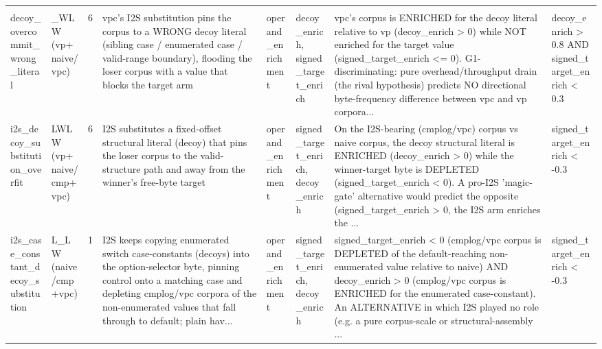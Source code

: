 \documentclass[7pt]{extarticle}
\begin{document}
{\begin{longtable}{@{}p{2.4cm}p{1.9cm}rp{4.3cm}p{1.5cm}p{1.7cm}p{4.6cm}p{3.0cm}@{}}
\midrule
\rowcolor{black!10}\multicolumn{8}{@{}l}{\textbf{[I2S-anti]\ \ i2s\_\allowbreak anti\_\allowbreak decoy\_\allowbreak overfit}\quad(final feature, n=14)}\\
decoy\_\allowbreak overcommit\_\allowbreak wrong\_\allowbreak literal & \_\allowbreak WLW (vp+naive/vpc) & 6 & vpc's I2S substitution pins the corpus to a WRONG decoy literal (sibling case / enumerated case / valid-range boundary), flooding the loser corpus with a value that blocks the target arm & operand\_\allowbreak enrichment & decoy\_\allowbreak enrich, signed\_\allowbreak target\_\allowbreak enrich & vpc's corpus is ENRICHED for the decoy literal relative to vp (decoy\_\allowbreak enrich \textgreater{} 0) while NOT enriched for the target value (signed\_\allowbreak target\_\allowbreak enrich \textless{}= 0). G1-discriminating: pure overhead/throughput drain (the rival hypothesis) predicts NO directional byte-frequency difference between vpc and vp corpora... & decoy\_\allowbreak enrich \textgreater{} 0.8 AND signed\_\allowbreak target\_\allowbreak enrich \textless{} 0.3\\
i2s\_\allowbreak decoy\_\allowbreak substitution\_\allowbreak overfit & LWLW (vp+naive/cmp+vpc) & 6 & I2S substitutes a fixed-offset structural literal (decoy) that pins the loser corpus to the valid-structure path and away from the winner's free-byte target & operand\_\allowbreak enrichment & signed\_\allowbreak target\_\allowbreak enrich, decoy\_\allowbreak enrich & On the I2S-bearing (cmplog/vpc) corpus vs naive corpus, the decoy structural literal is ENRICHED (decoy\_\allowbreak enrich \textgreater{} 0) while the winner-target byte is DEPLETED (signed\_\allowbreak target\_\allowbreak enrich \textless{} 0). A pro-I2S 'magic-gate' alternative would predict the opposite (signed\_\allowbreak target\_\allowbreak enrich \textgreater{} 0, the I2S arm enriches the ... & signed\_\allowbreak target\_\allowbreak enrich \textless{} -0.3\\
i2s\_\allowbreak case\_\allowbreak constant\_\allowbreak decoy\_\allowbreak substitution & L\_\allowbreak LW (naive/cmp+vpc) & 1 & I2S keeps copying enumerated switch case-constants (decoys) into the option-selector byte, pinning control onto a matching case and depleting cmplog/vpc corpora of the non-enumerated values that fall through to default; plain hav... & operand\_\allowbreak enrichment & signed\_\allowbreak target\_\allowbreak enrich, decoy\_\allowbreak enrich & signed\_\allowbreak target\_\allowbreak enrich \textless{} 0 (cmplog/vpc corpus is DEPLETED of the default-reaching non-enumerated value relative to naive) AND decoy\_\allowbreak enrich \textgreater{} 0 (cmplog/vpc corpus is ENRICHED for the enumerated case-constant). An ALTERNATIVE in which I2S played no role (e.g. a pure corpus-scale or structural-assembly ... & signed\_\allowbreak target\_\allowbreak enrich \textless{} -0.3\\

\end{longtable}}
\end{document}
